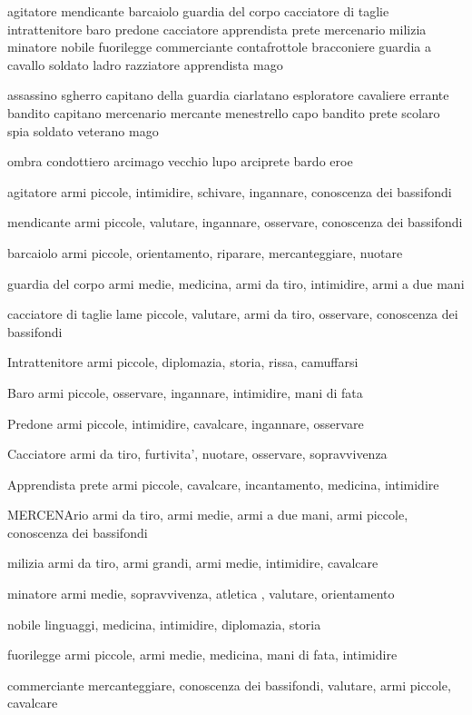 \documentclass[12pt,a4paper,twoside,openany,twocolumn]{book}
\begin{document}
agitatore
mendicante
barcaiolo
guardia del corpo
cacciatore di taglie
intrattenitore
baro
predone
cacciatore
apprendista prete
mercenario
milizia
minatore
nobile
fuorilegge
commerciante
contafrottole
bracconiere
guardia a cavallo
soldato
ladro
razziatore
apprendista mago


assassino
sgherro
capitano della guardia
ciarlatano
esploratore
cavaliere errante
bandito
capitano mercenario
mercante
menestrello
capo bandito
prete
scolaro
spia
soldato veterano
mago

ombra
condottiero
arcimago
vecchio lupo
arciprete
bardo
eroe






agitatore
armi piccole, intimidire, schivare, ingannare, conoscenza dei bassifondi

mendicante
armi piccole, valutare, ingannare, osservare, conoscenza dei bassifondi

barcaiolo
armi piccole, orientamento, riparare,  mercanteggiare, nuotare

guardia del corpo
armi medie, medicina, armi da tiro, intimidire, armi a due mani

cacciatore di taglie
lame piccole, valutare, armi da tiro, osservare, conoscenza dei bassifondi

Intrattenitore
armi piccole, diplomazia, storia, rissa, camuffarsi

Baro
armi piccole, osservare, ingannare, intimidire, mani di fata

Predone
armi piccole, intimidire, cavalcare, ingannare,  osservare

Cacciatore
armi da tiro, furtivita', nuotare,  osservare, sopravvivenza

Apprendista prete
armi piccole, cavalcare, incantamento, medicina, intimidire

MERCENArio
armi da tiro, armi medie, armi a due mani, armi piccole, conoscenza dei bassifondi

milizia
armi da tiro, armi grandi, armi medie, intimidire, cavalcare

minatore
armi medie, sopravvivenza, atletica , valutare, orientamento

nobile
linguaggi, medicina, intimidire,  diplomazia, storia

fuorilegge
armi piccole, armi medie, medicina, mani di fata, intimidire

commerciante
mercanteggiare, conoscenza dei bassifondi, valutare, armi piccole, cavalcare
\end{document}
